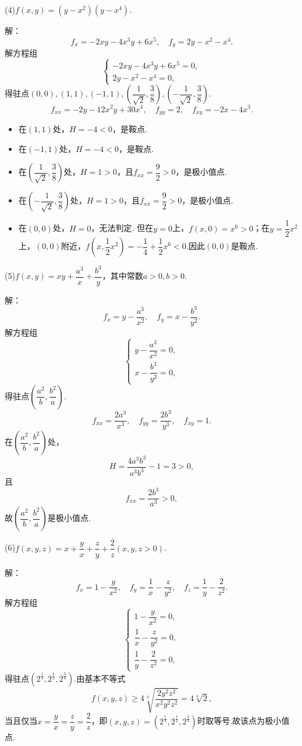 \documentclass[12pt, a4paper]{article}
\begin{document}
(4)\(f(x, y) = (y - x^2)(y - x^4).\)

解：
\[f_x =  -2x y - 4x^3y + 6x^5, \quad f_y = 2y - x^2 - x^4.\]
解方程组
\[\begin{cases}
-2x y - 4x^3y + 6x^5 = 0, \\
2y - x^2 - x^4 = 0,
\end{cases}\]
得驻点\((0, 0), (1, 1), (-1, 1), \left(\dfrac{1}{\sqrt{2}}, \dfrac{3}{8}\right), \left(-\dfrac{1}{\sqrt{2}}, \dfrac{3}{8}\right)\).
\[f_{xx} = -2y - 12x^2y + 30x^4, \quad f_{yy} = 2, \quad f_{xy} = -2x - 4x^3.\]
\begin{itemize}
\item 在\((1, 1)\)处，\(H = -4 < 0\)，是鞍点.
\item 在\((-1, 1)\)处，\(H = -4 < 0\)，是鞍点.
\item 在\(\left(\dfrac{1}{\sqrt{2}}, \dfrac{3}{8}\right)\)处，\(H = 1 > 0\)，且\(f_{xx} = \dfrac{9}{2} > 0\)，是极小值点.
\item 在\(\left(-\dfrac{1}{\sqrt{2}}, \dfrac{3}{8}\right)\)处，\(H = 1 > 0\)，且\(f_{xx} = \dfrac{9}{2} > 0\)，是极小值点.
\item 在\((0, 0)\)处，\(H = 0\)，无法判定. 但在\(y = 0\)上，\(f(x, 0) = x^6 > 0\)；在\(y = \dfrac{1}{2}x^2\)上，\((0, 0)\)附近，\(f\left(x, \dfrac{1}{2}x^2\right) = -\dfrac{1}{4} + \dfrac{1}{2}x^6 < 0\).因此\((0, 0)\)是鞍点.
\end{itemize}

(5)\(f(x, y) = xy + \dfrac{a^3}{x} + \dfrac{b^3}{y}\)，其中常数\(a > 0, b > 0\).

解：
\[f_x = y - \frac{a^3}{x^2}, \quad f_y = x - \frac{b^3}{y^2}.\]
解方程组
\[\begin{cases}
y - \dfrac{a^3}{x^2} = 0, \\
x - \dfrac{b^3}{y^2} = 0,
\end{cases}\]
得驻点\(\left(\dfrac{a^2}{b}, \dfrac{b^2}{a}\right)\).
\[f_{xx} = \frac{2a^3}{x^3}, \quad f_{yy} = \frac{2b^3}{y^3}, \quad f_{xy} = 1.\]
在\(\left(\dfrac{a^2}{b}, \dfrac{b^2}{a}\right)\)处，
\[H = \frac{4a^3b^3}{a^3b^3} - 1 = 3 > 0,\]
且
\[f_{xx} = \frac{2b^3}{a^3} > 0,\]
故\(\left(\dfrac{a^2}{b}, \dfrac{b^2}{a}\right)\)是极小值点.

(6)\(f(x, y, z) = x + \dfrac{y}{x} + \dfrac{z}{y} + \dfrac{2}{z}(x, y, z > 0)\).

解：
\[f_x = 1 - \frac{y}{x^2}, \quad f_y = \frac{1}{x} - \frac{z}{y^2}, \quad f_z = \frac{1}{y} - \frac{2}{z^2}.\]
解方程组
\[\begin{cases}
1 - \dfrac{y}{x^2} = 0, \\
\dfrac{1}{x} - \dfrac{z}{y^2} = 0, \\
\dfrac{1}{y} - \dfrac{2}{z^2} = 0,
\end{cases}\]
得驻点\(\left(2^{\frac{1}{4}}, 2^{\frac{1}{2}}, 2^{\frac{3}{4}}\right)\).由基本不等式
\[f(x, y, z) \geq 4\sqrt[4]{\frac{2y^2z^2}{x^2y^2z^2}} = 4\sqrt[4]{2},\]
当且仅当\(x = \dfrac{y}{x} = \dfrac{z}{y} = \dfrac{2}{z}\)，即\((x, y, z) = \left(2^{\frac{1}{4}}, 2^{\frac{1}{2}}, 2^{\frac{3}{4}}\right)\)时取等号.故该点为极小值点.
\end{document}
